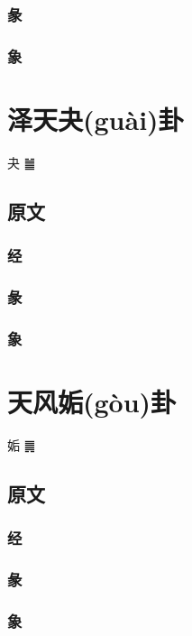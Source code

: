 \documentclass[12pt,oneside]{book}
\begin{document}
\subsection{彖}

\subsection{象}

\chapter{泽天夬(guài)卦}
夬 {\Large ䷪}
\section{原文}

\subsection{经}

\subsection{彖}

\subsection{象}



\chapter{天风姤(gòu)卦}
姤 {\Large ䷫}

\section{原文}

\subsection{经}

\subsection{彖}

\subsection{象}
\end{document}
